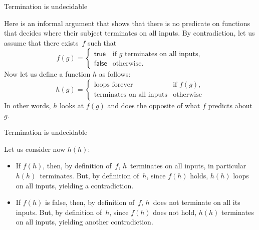 \documentclass[compress,dvipdfmx]{beamer}
\begin{document}
%
\begin{frame}{Termination is undecidable}

  Here is an informal argument that shows that there is no predicate
  on functions that decides where their subject terminates on all
  inputs. By contradiction, let us assume that there exists~\(f\) such that
  \begin{equation*}
    f(g) =
    \begin{cases}
      \mathsf{true}  & \text{if $g$ terminates on all inputs},\\
      \mathsf{false} & \text{otherwise}.
    \end{cases}
  \end{equation*}
  Now let us define a function \(h\) as follows:
  \begin{equation*}
    h(g) =
    \begin{cases}
      \text{loops forever} & \text{if } f(g),\\
      \text{terminates on all inputs}    & \text{otherwise}
    \end{cases}
  \end{equation*}
  In other words, \(h\) looks at \(f(g)\) and does the opposite of
  what \(f\) predicts about \(g\).

\end{frame}

%
\begin{frame}{Termination is undecidable}

  Let us consider now \(h(h)\):
  \begin{itemize}

    \item If \(f(h)\), then, by definition of~\(f\), \(h\)~terminates
      on all inputs, in particular \(h(h)\)~terminates. But, by
      definition of~\(h\), since \(f(h)\) holds, \(h(h)\) loops on all
      inputs, yielding a contradiction.

    \item If \(f(h)\) is false, then, by definition of~\(f\),
      \(h\)~does not terminate on all its inputs. But, by definition
      of~\(h\), since \(f(h)\) does not hold, \(h(h)\) terminates on
      all inputs, yielding another contradiction.

  \end{itemize}

\end{frame}
\end{document}
